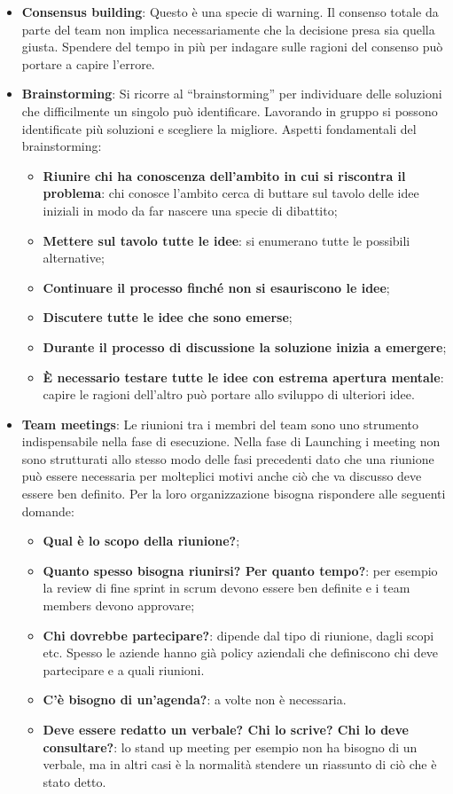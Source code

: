 \begin{itemize}
\begin{itemize}
	\end{itemize}
	\item \textbf{Consensus building}: Questo è una specie di warning. Il consenso totale da parte del team non implica necessariamente che la decisione presa sia quella giusta. Spendere del tempo in più per indagare sulle ragioni del consenso può portare a capire l'errore.
	\item \textbf{Brainstorming}: Si ricorre al “brainstorming” per individuare delle soluzioni che difficilmente un singolo può identificare. Lavorando in gruppo si possono identificate più soluzioni e scegliere la migliore. Aspetti fondamentali del brainstorming:
	\begin{itemize}
		\item \textbf{Riunire chi ha conoscenza dell’ambito in cui si riscontra il problema}: chi conosce l'ambito cerca di buttare sul tavolo delle idee iniziali in modo da far nascere una specie di dibattito;
		\item \textbf{Mettere sul tavolo tutte le idee}: si enumerano tutte le possibili alternative;
		\item \textbf{Continuare il processo finché non si esauriscono le idee};
		\item \textbf{Discutere tutte le idee che sono emerse};
		\item \textbf{Durante il processo di discussione la soluzione inizia a emergere};
		\item \textbf{\`E necessario testare tutte le idee con estrema apertura mentale}: capire le ragioni dell'altro può portare allo sviluppo di ulteriori idee.
	\end{itemize}
	\item \textbf{Team meetings}: Le riunioni tra i membri del team sono uno strumento indispensabile nella fase di esecuzione. Nella fase di Launching i meeting non sono strutturati allo stesso modo delle fasi precedenti dato che una riunione può essere necessaria per molteplici motivi anche ciò che va discusso deve essere ben definito. Per la loro organizzazione bisogna rispondere alle seguenti domande:
	\begin{itemize}
		\item \textbf{Qual è lo scopo della riunione?};
		\item \textbf{Quanto spesso bisogna riunirsi? Per quanto tempo?}: per esempio la review di fine sprint in scrum devono essere ben definite e i team members devono approvare;
		\item \textbf{Chi dovrebbe partecipare?}: dipende dal tipo di riunione, dagli scopi etc. Spesso le aziende hanno già policy aziendali che definiscono chi deve partecipare e a quali riunioni.
		\item \textbf{C’è bisogno di un’agenda?}: a volte non è necessaria.
		\item \textbf{Deve essere redatto un verbale? Chi lo scrive? Chi lo deve consultare?}: lo stand up meeting per esempio non ha bisogno di un verbale, ma in altri casi è la normalità stendere un riassunto di ciò che è stato detto.
	\end{itemize}
\end{itemize}

